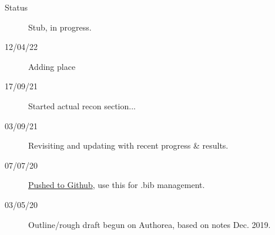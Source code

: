 \begin{description}
\item [{Status}] Stub, in progress.
\item [{12/04/22}] Adding place
\item [{17/09/21}] Started actual recon section...
\item [{03/09/21}] Revisiting and updating with recent progress \& results.
\item [{07/07/20}] \href{https://github.com/phockett/Extracting-Molecular-Frame-Photoionization-Dynamics-from-Experimental-Data}{Pushed to Github}, use this for .bib management.
\item [{03/05/20}] Outline/rough draft begun on Authorea, based on notes Dec. 2019.
\end{description}
